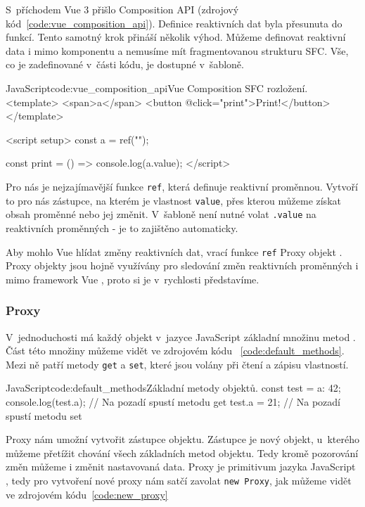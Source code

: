 \documentclass[
  master,
  program=ainf,
  tables=false,
  sourcecodes,
  glossaries,
  index
]{kidiplom}
\begin{document}
S~příchodem Vue 3 \cite{vue} přišlo Composition API (zdrojový kód~\ref{code:vue_composition_api}). 
Definice reaktivních dat byla přesunuta do funkcí. Tento samotný krok přináší několik výhod. Můžeme 
definovat reaktivní data i mimo komponentu a nemusíme mít fragmentovanou strukturu SFC. Vše, co je
zadefinované v~části kódu, je dostupné v~šabloně. 


  \begin{kicode}{JavaScript}{code:vue_composition_api}{Vue Composition SFC rozložení.}
    <template>
      <span>{{a}}</span>
      <button @click="print">Print!</button>
    </template>
  
    <script setup>
      const a = ref("");
  
      const print = () => {
        console.log(a.value);
      }
    </script>
  \end{kicode}
  
Pro nás je nejzajímavější funkce {\tt ref}, která definuje reaktivní proměnnou.
Vytvoří to pro nás zástupce, na kterém je vlastnost {\tt value}, přes kterou můžeme
získat obsah proměnné nebo jej změnit. V~šabloně není nutné volat {\tt .value} na
reaktivních proměnných - je to zajištěno automaticky.

Aby mohlo Vue \cite{vue} hlídat změny reaktivních dat, vrací funkce {\tt ref} Proxy objekt \cite{proxy}. Proxy
objekty \cite{proxy} jsou hojně využívány pro sledování změn reaktivních proměnných i mimo framework
Vue \cite{vue}, proto si je v~rychlosti představíme.

\subsubsection{Proxy}

V~jednoduchosti má každý objekt v~jazyce JavaScript \cite{js} základní množinu metod \cite{default_methods}. Část této množiny můžeme vidět
ve zdrojovém kódu ~\ref{code:default_methods}.
Mezi ně patří metody {\tt get} a {\tt set}, které jsou volány při čtení a zápisu vlastností.

\begin{kicode}{JavaScript}{code:default_methods}{Základní metody objektů.}
  const test = {a: 42};
  console.log(test.a); // Na pozadí spustí metodu get
  test.a = 21; // Na pozadí spustí metodu set
\end{kicode}

Proxy nám umožní vytvořit zástupce objektu. Zástupce je nový objekt, u~kterého
můžeme přetížit chování všech základních metod objektu. Tedy kromě pozorování 
změn můžeme i změnit nastavovaná data. Proxy je primitivum jazyka JavaScript \cite{js}, tedy
pro vytvoření nové proxy nám satčí zavolat {\tt new Proxy}, jak můžeme vidět ve zdrojovém kódu~\ref{code:new_proxy}
\end{document}
